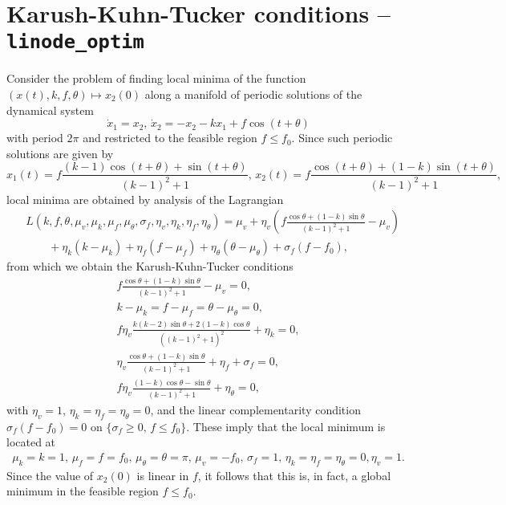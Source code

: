 \section{Karush-Kuhn-Tucker conditions -- \texttt{linode\_optim}}
Consider the problem of finding local minima of the function $(x(t),k,f,\theta)\mapsto x_2(0)$ along a manifold of periodic solutions of the dynamical system
\begin{equation}
\dot{x}_1=x_2,\,\dot{x}_2=-x_2-kx_1+f\cos (t+\theta)
\end{equation}
with period $2\pi$ and restricted to the feasible region $f\leq f_0$. Since such periodic solutions are given by
\begin{equation}
\label{eq: linodeexplicit}
x_1(t)=f\frac{(k-1)\cos(t+\theta)+\sin(t+\theta)}{(k-1)^2+1},\,x_2(t)=f\frac{\cos(t+\theta)+(1-k)\sin(t+\theta)}{(k-1)^2+1},
\end{equation}
local minima are obtained by analysis of the Lagrangian
\begin{align}
&L\left(k,f,\theta,\mu_v,\mu_k,\mu_f,\mu_\theta,\sigma_f,\eta_v,\eta_k,\eta_f,\eta_\theta\right)=\mu_v+ \eta_v\left(f\frac{\cos\theta+(1-k)\sin\theta}{(k-1)^2+1}-\mu_v\right)\nonumber\\
&\qquad+\eta_k(k-\mu_k)+\eta_f(f-\mu_f)+\eta_\theta(\theta-\mu_\theta)+\sigma_f(f-f_0),
\end{align}
from which we obtain the Karush-Kuhn-Tucker conditions
\begin{gather}
\label{eq:KKTfirst}
f\frac{\cos\theta+(1-k)\sin\theta}{(k-1)^2+1}-\mu_v=0,\\
k-\mu_k=f-\mu_f=\theta-\mu_\theta=0,\\
f\eta_v\frac{k(k-2)\sin\theta+2(1-k)\cos\theta}{\left((k-1)^2+1\right)^2}+\eta_k=0,\\
\eta_v\frac{\cos\theta+(1-k)\sin\theta}{(k-1)^2+1}+\eta_f+\sigma_f=0,\\
f\eta_v\frac{(1-k)\cos\theta-\sin\theta}{(k-1)^2+1}+\eta_\theta=0,
\label{eq:KKTlast}
\end{gather}
with $\eta_v=1$, $\eta_k=\eta_f=\eta_\theta=0$, and the linear complementarity condition $\sigma_f(f-f_0)=0$ on $\{\sigma_f\ge 0,\,f\le f_0\}$. These imply that the local minimum is located at
\begin{gather}
\mu_k=k=1,\,\mu_f=f=f_0,\,\mu_\theta=\theta=\pi,\,\mu_v=-f_0,\,\sigma_f=1,\,\eta_k=\eta_f=\eta_\theta=0,\eta_v=1.
\end{gather}
Since the value of $x_2(0)$ is linear in $f$, it follows that this is, in fact, a global minimum in the feasible region $f\le f_0$.

